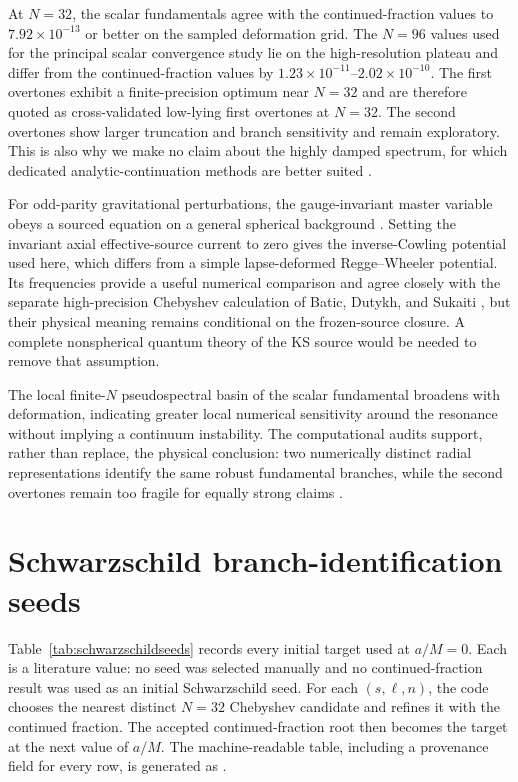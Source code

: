 \documentclass[12pt,a4paper]{article}
\begin{document}
At \(N=32\), the scalar fundamentals agree with the continued-fraction values
to \(7.92\times10^{-13}\) or better on the sampled deformation grid. The
\(N=96\) values used for the principal scalar convergence study lie on the
high-resolution plateau and differ from the continued-fraction values by
\(1.23\times10^{-11}\)--\(2.02\times10^{-10}\). The first overtones exhibit a
finite-precision optimum near \(N=32\) and are therefore quoted as
cross-validated low-lying first overtones at \(N=32\). The second overtones
show larger truncation and branch sensitivity and remain exploratory. This is
also why we make no claim about the highly damped spectrum, for which dedicated
analytic-continuation methods are better suited \cite{Chen2025}.

For odd-parity gravitational perturbations, the gauge-invariant master variable
obeys a sourced equation on a general spherical background
\cite{Gerlach1979,Gundlach1999,Karlovini2002}. Setting the invariant axial
effective-source current to zero gives the inverse-Cowling potential used here,
which differs from a simple lapse-deformed Regge--Wheeler potential. Its
frequencies provide a useful numerical comparison and agree closely with the
separate high-precision Chebyshev calculation of Batic, Dutykh, and Sukaiti
\cite{BaticDutykhSukaiti2026}, but their
physical meaning remains conditional on the frozen-source closure. A complete
nonspherical quantum theory of the KS source would be needed to remove that
assumption.

The local finite-\(N\) pseudospectral basin of the scalar fundamental broadens
with deformation, indicating greater local numerical sensitivity around the
resonance without implying a continuum instability.  The computational audits
support, rather than replace, the physical conclusion: two numerically distinct
radial representations identify the same robust fundamental branches, while the
second overtones remain too fragile for equally strong claims
\cite{Leaver1985,Jansen2017,Jaramillo2021}.

\appendix
\section{Schwarzschild branch-identification seeds}
\label{sec:schwarzschildseeds}

Table~\ref{tab:schwarzschildseeds} records every initial target used at
\(a/M=0\). Each is a literature value: no seed was selected manually and no
continued-fraction result was used as an initial Schwarzschild seed. For each
\((s,\ell,n)\), the code chooses the nearest distinct \(N=32\) Chebyshev
candidate and refines it with the continued fraction. The accepted
continued-fraction root then becomes the target at the next value of \(a/M\).
The machine-readable table, including a provenance field for every row, is
generated as .
\end{document}
